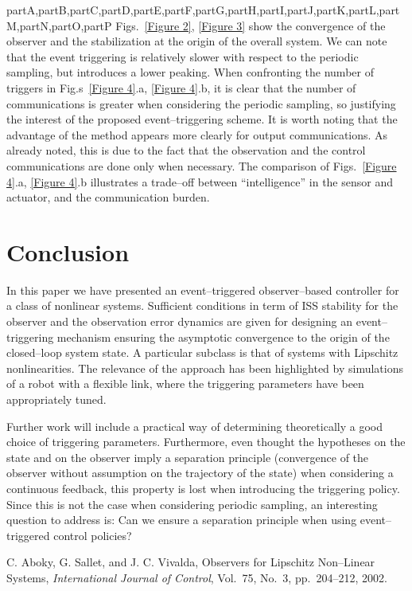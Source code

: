 \documentclass[letterpaper, 10 pt, conference]{ieeeconf}
\def\compile{partA,partB,partC,partD,partE,partF,partG,partH,partI,partJ,partK,partL,partM,partN,partO,partP}
\newenvironment{partP}[1][]{}{}
\begin{document}
\begin{xcomment}{\compile}
\begin{partP}
Figs.~\ref{Figure 2}, \ref{Figure 3} show the convergence of the observer and the stabilization at the origin of the overall system. We can note that the event triggering is relatively slower with respect to the periodic sampling, but introduces a lower peaking. When confronting the number of triggers in Fig.s~\ref{Figure 4}.a, \ref{Figure 4}.b, it is clear that the number of communications is greater when considering the periodic sampling, so justifying the interest of the proposed event--triggering scheme. It is worth noting that the advantage of the method appears more clearly for output communications. As already noted, this is due to the fact that the observation and the control communications are done only when necessary. The comparison of Figs.~\ref{Figure 4}.a, \ref{Figure 4}.b illustrates a trade--off between ``intelligence'' in the sensor and actuator, and the communication burden.

\section{Conclusion}

In this paper we have presented an event--triggered observer--based controller for a class of nonlinear systems. Sufficient conditions in term of ISS stability for the observer and the observation error dynamics are given for designing an event--triggering mechanism ensuring the asymptotic convergence to the origin of the closed--loop system state. A particular subclass is that of systems with Lipschitz nonlinearities. The relevance of the approach has been highlighted by simulations of a robot with a flexible link, where the triggering parameters have been appropriately tuned.

Further work will include a practical way of determining theoretically a good choice of triggering parameters. Furthermore, even thought the hypotheses on the state and on the observer imply a separation principle (convergence of the observer without assumption on the trajectory of the state) when considering a continuous feedback, this property is lost when introducing the triggering policy. Since this is not the case when considering periodic sampling, an interesting question to address is: Can we ensure a separation principle when using event--triggered control policies?



\begin{thebibliography}{99}

 C. Aboky, G. Sallet, and J. C. Vivalda, Observers for Lipschitz Non--Linear Systems, {\sl International Journal of Control}, Vol.~75, No.~3, pp.~204--212, 2002.





\end{thebibliography}
\end{partP}
\end{xcomment}
\end{document}
